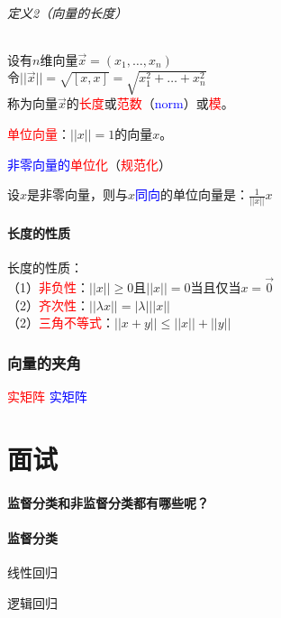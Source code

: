 \documentclass[UTF8]{ctexbook}
\begin{document}
\paragraph{定义2（向量的长度）}设有$n$维向量$\vec{x}=(x_{1},\dots,x_{n})$\\
令$||\vec{x}||=\sqrt{[x,x]}=\sqrt{x_{1}^{2}+\dots+x_{n}^{2}}$\\
称为向量$\vec{x}$的\textcolor{red}{长度}或\textcolor{red}{范数}（\textcolor{blue}{norm}）或\textcolor{red}{模}。

\textcolor{red}{单位向量}：$||x||=1$的向量$x$。

\textcolor{blue}{非零向量的}\textcolor{red}{单位化}（\textcolor{red}{规范化}）

设$x$是非零向量，则与$x$\textcolor{blue}{同向}的单位向量是：$\frac{1}{||x||}x$

\subsection{长度的性质}

长度的性质：\\
（1）\textcolor{red}{非负性}：$||x|| \geq 0$且$||x||=0$当且仅当$x = \vec{0}$\\
（2）\textcolor{red}{齐次性}：$||\lambda x||=|\lambda|||x||$\\
（2）\textcolor{red}{三角不等式}：$||x+y|| \leq ||x|| + ||y||$\\


\section{向量的夹角}

\textcolor{red}{实矩阵}
\textcolor{blue}{实矩阵}



\part{面试}

\subsection{监督分类和非监督分类都有哪些呢？}

\subsection{监督分类}

线性回归

逻辑回归
\end{document}
